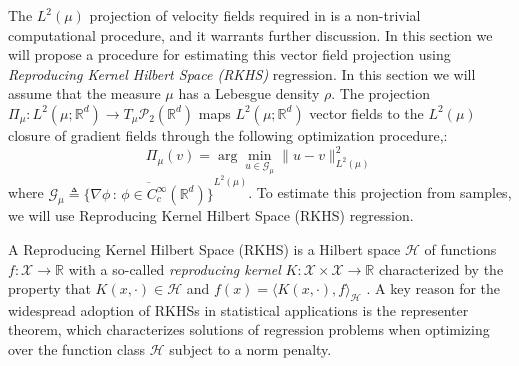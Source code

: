 \documentclass[11pt]{article}
\begin{document}
The $L^2(\mu)$ projection of velocity fields required in  is a non-trivial computational procedure, and it warrants further discussion. In this section we will propose a procedure for estimating this vector field projection using \textit{Reproducing Kernel Hilbert Space (RKHS)} regression. In this section we will assume that the measure $\mu$ has a Lebesgue density $\rho$. The projection $\Pi_{\mu}: L^2(\mu; \mathbb{R}^d) \rightarrow T_\mu\mathcal{P}_2(\mathbb{R}^d)$ maps $L^2(\mu; \mathbb{R}^d)$ vector fields to the $L^2(\mu)$ closure of gradient fields through the following optimization procedure,:
\[\Pi_{\mu}(v) = \arg\min_{u \in \mathcal{G}_\mu}\|u - v\|_{L^2(\mu)}^2\]
where $\mathcal{G}_\mu \triangleq \overline{\{\nabla\phi\,:\, \phi \in C^{\infty}_c(\mathbb{R}^d) \}}^{L^2(\mu)}$. To estimate this projection from samples, we will use Reproducing Kernel Hilbert Space (RKHS) regression. 

A Reproducing Kernel Hilbert Space (RKHS) is a Hilbert space $\mathcal{H}$ of functions $f: \mathcal{X} \rightarrow \mathbb{R}$ with a so-called \textit{reproducing kernel} $K: \mathcal{X}\times \mathcal{X} \rightarrow \mathbb{R}$ characterized by the property that $K(x, \cdot ) \in \mathcal{H}$ and $f(x) = \langle K(x, \cdot), f \rangle_{\mathcal{H}}$ \citep{aronszajn1950theory}. A key reason for the widespread adoption of RKHSs in statistical applications is the representer theorem, which characterizes solutions of regression problems when optimizing over the function class $\mathcal{H}$ subject to a norm penalty.
\end{document}
